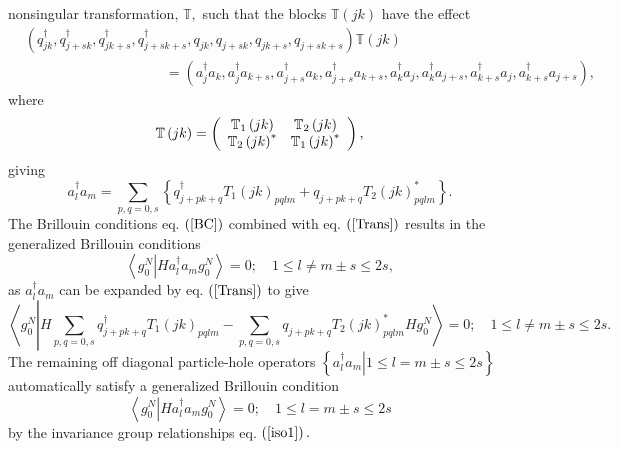 \documentclass[titlepage]{article}%
\begin{document}
nonsingular transformation, $\mathbb{T},$ such that the blocks $\mathbb{T}%
\left(  jk\right)  $ have the effect
\begin{align}
&  \left(  q_{jk}^{\dagger},q_{j+sk}^{\dagger},q_{jk+s}^{\dagger}%
,q_{j+sk+s}^{\dagger},q_{jk},q_{j+sk},q_{jk+s},q_{j+sk+s}\right)
\mathbb{T}\left(  jk\right)  \nonumber\\
&  \qquad\qquad\qquad\qquad\qquad\left.  =\right.  \left(  a_{j}^{\dagger
}a_{k},a_{j}^{\dagger}a_{k+s},a_{j+s}^{\dagger}a_{k},a_{j+s}^{\dagger}%
a_{k+s},a_{k}^{\dagger}a_{j},a_{k}^{\dagger}a_{j+s},a_{k+s}^{\dagger}%
a_{j},a_{k+s}^{\dagger}a_{j+s}\right)  ,
\end{align}
where
\begin{equation}
\mathbb{T}\left(  jk\right)  =\left(
\begin{array}
[c]{cc}%
\mathbb{T}_{1}\left(  jk\right)   & \mathbb{T}_{2}\left(  jk\right)  \\
\mathbb{T}_{2}\left(  jk\right)  ^{\ast} & \mathbb{T}_{1}\left(  jk\right)
^{\ast}%
\end{array}
\right)  ,
\end{equation}
giving
\begin{equation}
a_{l}^{\dagger}a_{m}=\sum_{p,q=0,s}\left\{  q_{j+pk+q}^{\dagger}T_{1}\left(
jk\right)  _{pqlm}+q_{j+pk+q}T_{2}\left(  jk\right)  _{pqlm}^{\ast}\right\}
.\label{Trans}%
\end{equation}
The Brillouin conditions eq. $\left(  \ref{BC}\right)  $ combined with eq.
$\left(  \ref{Trans}\right)  $ results in the generalized Brillouin
conditions
\begin{equation}
\left\langle g_{0}^{N}\left\vert Ha_{l}^{\dagger}a_{m}\right.  g_{0}%
^{N}\right\rangle =0;\quad1\leq l\neq m\pm s\leq2s,\label{GBC}%
\end{equation}
as $a_{l}^{\dagger}a_{m}$ can be expanded by eq. $\left(  \ref{Trans}\right)
$ to give%
\begin{equation}
\left\langle g_{0}^{N}\left\vert H\sum_{p,q=0,s}q_{j+pk+q}^{\dagger}%
T_{1}\left(  jk\right)  _{pqlm}-\sum_{p,q=0,s}q_{j+pk+q}T_{2}\left(
jk\right)  _{pqlm}^{\ast}Hg_{0}^{N}\right.  \right\rangle =0;\quad1\leq l\neq
m\pm s\leq2s.
\end{equation}
The remaining off diagonal particle-hole operators $\left\{  \left.
a_{l}^{\dagger}a_{m}\right\vert 1\leq l=m\pm s\leq2s\right\}  $ automatically
satisfy a generalized Brillouin condition
\begin{equation}
\left\langle g_{0}^{N}\left\vert Ha_{l}^{\dagger}a_{m}g_{0}^{N}\right.
\right\rangle =0;\quad1\leq l=m\pm s\leq2s\label{ph}%
\end{equation}
by the invariance group relationships eq. $\left(  \ref{iso1}\right)  .$
\end{document}
